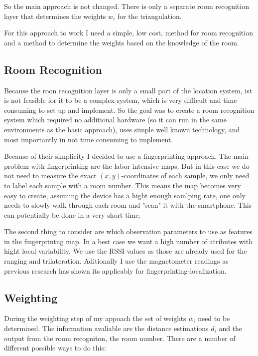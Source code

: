 
So the main approach is not changed. There is only a separate room recognition layer that determines the weights \(w_{i}\) for the triangulation.

For this approach to work I need a simple, low cost, method for room recognition and a method to determine the weights based on the knowledge of the room.

\subsection{Room Recognition}
Because the roon recognition layer is only a small part of the location system, ist is not feasible for it to be a complex system, which is very difficult and time consuming to set up and implement. So the goal was to create a room recognition system which required no additional hardware (so it can run in the same environments as the basic approach), uses simple well known technology, and most importantly in not time consuming to implement.

Because of their simplicity I decided to use a fingerprinting approach. The main problem with fingerprinting are the labor intensive maps. But in this case we do not need to measure the exact \((x,y)\)-coordinates of each sample, we only need to label each sample with a room number. This means the map becomes very easy to create, assuming the device has a hight enough samlping rate, one only needs to slowly walk through each room and "scan" it with the smartphone. This can potentially be done in a very short time. 

The second thing to consider are which observation parameters to use as features in the fingerprintng map. In a best case we want a high number of atributes with hight local variability. We use the RSSI values as those are already used for the ranging and trilateration. Aditionally I use the magnetometer readings as previous research has shown its applicably for fingerprinting-localization.

\subsection{Weighting}

During the weighting step of my appoach the set of weights \(w_i\) need to be determined. The information avaliable are the distance estimations \(d_i\) and the output from the room recogniton, the room number. There are a number of different possible ways to do this:

